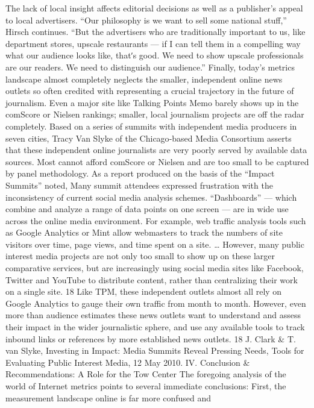 The lack of local insight affects editorial decisions as well as a publisher’s
appeal to local advertisers. ``Our philosophy is we want to sell some
national stuff,'' Hirsch continues. ``But the advertisers who are
traditionally important to us, like department stores, upscale restaurants
— if I can tell them in a compelling way what our audience looks like,
thatʹs good. We need to show upscale professionals are our readers. We
need to distinguish our audience.''
Finally, today’s metrics landscape almost completely neglects the smaller,
independent online news outlets so often credited with representing a
crucial trajectory in the future of journalism. Even a major site like Talking
Points Memo barely shows up in the comScore or Nielsen rankings;
smaller, local journalism projects are off the radar completely.
Based on a series of summits with independent media producers in seven
cities, Tracy Van Slyke of the Chicago‐based Media Consortium asserts
that these independent online journalists are very poorly served by
available data sources. Most cannot afford comScore or Nielsen and are
too small to be captured by panel methodology. As a report produced on
the basis of the ``Impact Summits'' noted,
Many summit attendees expressed frustration with the
inconsistency of current social media analysis schemes.
``Dashboards'' — which combine and analyze a range of data
points on one screen — are in wide use across the online media
environment. For example, web traffic analysis tools such as
Google Analytics or Mint allow webmasters to track the numbers of
site visitors over time, page views, and time spent on a site. \ldots 
However, many public interest media projects are not only too
small to show up on these larger comparative services, but are
increasingly using social media sites like Facebook, Twitter and
YouTube to distribute content, rather than centralizing their work
on a single site. 18
Like TPM, these independent outlets almost all rely on Google Analytics
to gauge their own traffic from month to month. However, even more
than audience estimates these news outlets want to understand and assess
their impact in the wider journalistic sphere, and use any available tools to
track inbound links or references by more established news outlets.
18 J. Clark & T. van Slyke, Investing in Impact: Media Summits Reveal Pressing
Needs, Tools for Evaluating Public Interest Media, 12 May 2010.
IV. Conclusion & Recommendations: A Role for the Tow Center
The foregoing analysis of the world of Internet metrics points to several
immediate conclusions:
First, the measurement landscape online is far more confused and
